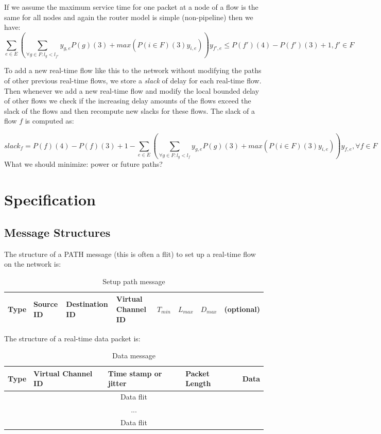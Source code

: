 \documentclass[10pt]{article}
\begin{document}
If we assume the maximum service time for one packet at a node of a flow is the same
for all nodes and again the router model is simple (non-pipeline) then we have:
\begin{equation}\label{equ:e2eDelayNewPath2}
\sum_{e \in E} (\sum_{\forall g \in F:l_g <
l_{f'}}y_{g,e}P(g)(3)+max(P(i \in F)(3)y_{i,e}))y_{f',e} \leq P(f')(4)-P(f')(3)
+ 1, f' \in F
\end{equation}

To add a new real-time flow like this to the network without modifying the paths
of other previous real-time flows, we store a {\em slack} of delay for each
real-time flow. Then whenever we add a new real-time flow and modify the local
bounded delay of other flows we check if the increasing delay amounts of the
flows exceed the slack of the flows and then recompute new slacks for these
flows. The slack of a flow $f$ is computed as:

\begin{equation}
	slack_f=P(f)(4)-P(f)(3) +
1 - \sum_{e \in E} (\sum_{\forall g \in F:l_g <
l_{f}}y_{g,e}P(g)(3)+max(P(i \in F)(3)y_{i,e}))y_{f,e}, \forall f \in F
\end{equation}
What we should minimize: power or future paths?

\section{Specification}
\subsection{Message Structures}
The structure of a PATH message (this is often a flit) to set up a real-time 
flow on the network is:

\begin{table}[h]
\begin{center}
  \begin{tabular}{ | l | l | l | l | l | l | l | l | }
    \hline
	Type & Source ID & Destination ID & Virtual Channel ID & 
	$T_{min}$ & $L_{max}$ & $D_{max}$ & (optional) \\
    \hline
  \end{tabular}
\end{center}
\caption{Setup path message}
\label{table:PathMsg}
\end{table}

The structure of a real-time data packet is:

\begin{table}[h]
\begin{center}
  \begin{tabular}{ | l | l | l | l | l |}
    \hline
	Type & Virtual Channel ID & Time stamp or jitter & Packet Length & Data \\ \hline
	\multicolumn{5}{|c|}{Data flit} \\ \hline
	\multicolumn{5}{|c|}{...} \\ \hline
	\multicolumn{5}{|c|}{Data flit} \\
    \hline
  \end{tabular}
\end{center}
\caption{Data message}
\label{table:DataMsg}
\end{table}
\end{document}
